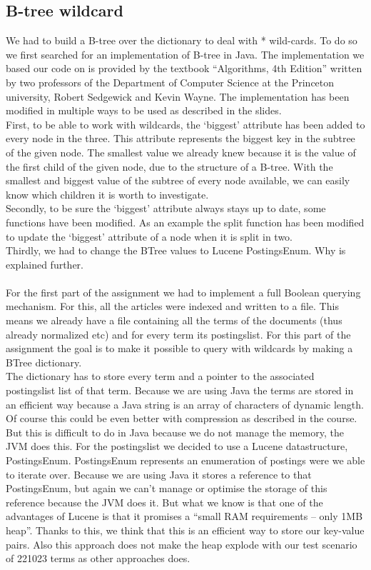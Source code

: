 \documentclass{article}
\begin{document}
\subsection{B-tree wildcard}
We had to build a B-tree over the dictionary to deal with * wild-cards. To do so we first searched for an implementation of B-tree in Java. The implementation we based our code on is provided by the textbook ``Algorithms, 4th Edition'' written by two professors of the Department of Computer Science at the Princeton university,  Robert Sedgewick and Kevin Wayne.
The implementation has been modified in multiple ways to be used as described in the slides.\\
First, to be able to work with wildcards, the `biggest' attribute has been added to every node in the three. This attribute represents the biggest key in the subtree of the given node. The smallest value we already knew because it is the value of the first child of the given node, due to the structure of a B-tree. With the smallest and biggest value of the subtree of every node available, we can easily know which children it is worth to investigate.\\
Secondly, to be sure the `biggest' attribute always stays up to date, some functions have been modified. As an example the split function has been modified to update the `biggest' attribute of a node when it is split in two.\\
Thirdly, we had to change the BTree values to Lucene PostingsEnum. Why is explained further.\\\\
For the first part of the assignment we had to implement a full Boolean querying mechanism. For this, all the articles were indexed and written to a file. This means we already have a file containing all the terms of the documents (thus already normalized etc) and for every term its postingslist. For this part of the assignment the goal is to make it possible to query with wildcards by making a BTree dictionary.\\
The dictionary has to store every term and a pointer to the associated postingslist list of that term. Because we are using Java the terms are stored in an efficient way because a Java string is an array of characters of dynamic length. Of course this could be even better with compression as described in the course. But this is difficult to do in Java because we do not manage the memory, the JVM does this. For the postingslist we decided to use a Lucene datastructure, PostingsEnum. PostingsEnum represents an enumeration of postings were we able to iterate over. Because we are using Java it stores a reference to that PostingsEnum, but again we can't manage or optimise the storage of this reference because the JVM does it. But what we know is that one of the advantages of Lucene is that it promises a ``small RAM requirements -- only 1MB heap''. Thanks to this, we think that this is an efficient way to store our key-value pairs. Also this approach does not make the heap explode with our test scenario of 221023 terms as other approaches does.\\
\end{document}
